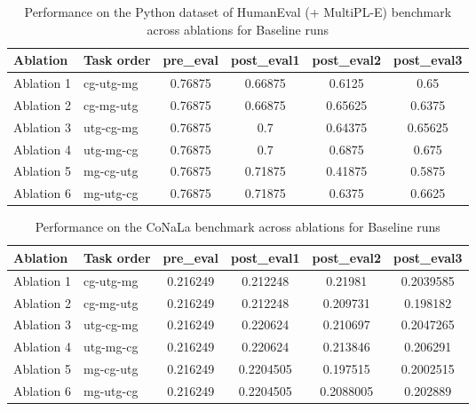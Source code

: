 \begin{table}[!ht]
    \centering
    \caption{Performance on the Python dataset of HumanEval (+ MultiPL-E) benchmark across ablations for Baseline runs}
    \begin{tabular}{|l|l|S[table-format=2.4]|S[table-format=2.4]|S[table-format=2.4]|S[table-format=2.4]|}
    \hline
        \textbf{Ablation} & \textbf{Task order} & \textbf{pre\_eval} & \textbf{post\_eval1} & \textbf{post\_eval2} & \textbf{post\_eval3 } \\ \hline
        Ablation 1 & cg-utg-mg & 0.76875 & 0.66875 & 0.6125 & 0.65  \\ 
        Ablation 2 & cg-mg-utg & 0.76875 & 0.66875 & 0.65625 & 0.6375  \\ 
        Ablation 3 & utg-cg-mg & 0.76875 & 0.7 & 0.64375 & 0.65625  \\ 
        Ablation 4 & utg-mg-cg & 0.76875 & 0.7 & 0.6875 & 0.675  \\ 
        Ablation 5 & mg-cg-utg & 0.76875 & 0.71875 & 0.41875 & 0.5875  \\ 
        Ablation 6 & mg-utg-cg & 0.76875 & 0.71875 & 0.6375 & 0.6625 \\ \hline
    \end{tabular}
    \label{tab:PythonBaseline}
\end{table}

\begin{table}[!ht]
    \centering
    \caption{Performance on the CoNaLa benchmark across ablations for Baseline runs}
    \begin{tabular}{|l|l|S[table-format=2.4]|S[table-format=2.4]|S[table-format=2.4]|S[table-format=2.4]|}
    \hline
        \textbf{Ablation} & \textbf{Task order} & \textbf{pre\_eval} & \textbf{post\_eval1} & \textbf{post\_eval2} & \textbf{post\_eval3 } \\ \hline
        Ablation 1 & cg-utg-mg & 0.216249 & 0.212248 & 0.21981 & 0.2039585  \\ 
        Ablation 2 & cg-mg-utg & 0.216249 & 0.212248 & 0.209731 & 0.198182  \\ 
        Ablation 3 & utg-cg-mg & 0.216249 & 0.220624 & 0.210697 & 0.2047265  \\ 
        Ablation 4 & utg-mg-cg & 0.216249 & 0.220624 & 0.213846 & 0.206291  \\ 
        Ablation 5 & mg-cg-utg & 0.216249 & 0.2204505 & 0.197515 & 0.2002515  \\ 
        Ablation 6 & mg-utg-cg & 0.216249 & 0.2204505 & 0.2088005 & 0.202889 \\ \hline
    \end{tabular}
    \label{tab:CoNaLaBaseline}
\end{table}

